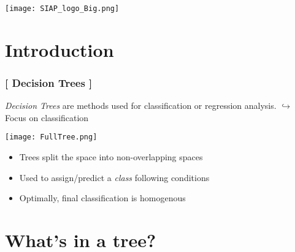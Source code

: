 \documentclass[xcolor=x11names,compress, handhouts]{beamer}
\renewcommand{\(}{\begin{columns}}
\renewcommand{\)}{\end{columns}}
\newcommand{\<}[1]{\begin{column}{#1}}
\renewcommand{\>}{\end{column}}
\begin{document}
\begin{frame}
\Large{ \color{siap}{Machine Learning for Official Statistics \& SDGs}}

\hspace{1cm}


\hspace{2cm}
\begin{center}

\texttt{[image: SIAP\_logo\_Big.png]}

\end{center}
\end{frame}



\section{Introduction}

\begin{frame} %

\frametitle{\textcolor{brique}{[ Decision Trees ]}}
\textit{Decision Trees} are methods used for classification or regression analysis. $\hookrightarrow$ Focus on classification\\
\begin{center} \texttt{[image: FullTree.png]} \end{center}
\pause
\begin{itemize}[<+->]
  \item Trees split the space into non-overlapping spaces
  \item Used to assign/predict a \textit{class} following conditions 
  \item Optimally, final classification is homogenous
\end{itemize}
\end{frame}

\section{What's in a tree?}
\end{document}
